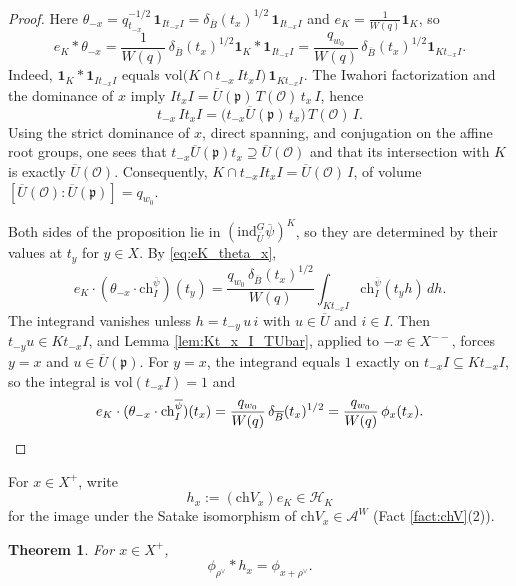 \documentclass[12pt]{article}
\numberwithin{equation}{section}
\newtheorem{theorem}{Theorem}[section]
\theoremstyle{definition}
\theoremstyle{remark}
\theoremstyle{plain}
\begin{document}
\begin{proof}
Here $\theta_{-x} = q_{t_{-x}}^{-1/2}\,\mathbf{1}_{It_{-x}I} = \delta_{\overline{B}}(t_{x})^{1/2}\,\mathbf{1}_{It_{-x}I}$ and $e_{K} = \frac{1}{W(q)}\mathbf{1}_{K}$, so
\begin{equation}\label{eq:eK_theta_x}
e_{K} * \theta_{-x} = \frac{1}{W(q)}\,\delta_{\overline{B}}(t_{x})^{1/2}\mathbf{1}_K * \mathbf{1}_{It_{-x}I} = \frac{q_{w_0}}{W(q)}\,\delta_{\overline{B}}(t_{x})^{1/2} \mathbf{1}_{Kt_{-x}I}.
\end{equation}
Indeed, $\mathbf{1}_K * \mathbf{1}_{It_{-x}I}$ equals $\mathrm{vol}\big(K \cap t_{-x}\, I t_{x} I\big)\,\mathbf{1}_{Kt_{-x}I}$. The Iwahori factorization and the dominance of $x$ imply $I t_x I = \overline{U}(\mathfrak{p})\, T(\mathcal{O})\, t_x\, I$, hence
$$t_{-x}\, I t_x I = \big(t_{-x}\overline{U}(\mathfrak{p})\, t_{x}\big)\, T(\mathcal{O})\, I.$$
Using the strict dominance of $x$, direct spanning, and conjugation on the affine root groups, one sees that $t_{-x}\overline U(\mathfrak p)t_x\supseteq\overline U(\mathcal O)$ and that its intersection with $K$ is exactly $\overline U(\mathcal O)$. Consequently, $K \cap t_{-x}It_xI = \overline{U}(\mathcal{O})\,I$, of volume $[\overline{U}(\mathcal{O}) : \overline{U}(\mathfrak{p})] = q_{w_0}$.

Both sides of the proposition lie in $(\mathrm{ind}_{\overline{U}}^{G}\overline{\psi})^{K}$, so they are determined by their values at $t_y$ for $y\in X$. By \eqref{eq:eK_theta_x},
$$e_{K}\cdot(\theta_{-x}\cdot \mathrm{ch}_{I}^{\overline{\psi}})(t_{y}) = \frac{q_{w_0}\,\delta_{\overline{B}}(t_{x})^{1/2}}{W(q)}\int_{Kt_{-x}I}\mathrm{ch}_{I}^{\overline{\psi}}(t_{y}h)\,dh.$$
The integrand vanishes unless $h = t_{-y}\,u\,i$ with $u \in \overline{U}$ and $i \in I$. Then $t_{-y}u \in Kt_{-x}I$, and Lemma \ref{lem:Kt_x_I_TUbar}, applied to $-x \in X^{--}$, forces $y = x$ and $u \in \overline{U}(\mathfrak p)$. For $y = x$, the integrand equals $1$ exactly on $t_{-x}I \subseteq Kt_{-x}I$, so the integral is $\mathrm{vol}(t_{-x}I) = 1$ and
\[e_{K}\cdot(\theta_{-x}\cdot \mathrm{ch}_{I}^{\overline{\psi}})(t_{x}) = \frac{q_{w_0}}{W(q)}\,\delta_{\overline{B}}(t_{x})^{1/2} = \frac{q_{w_0}}{W(q)}\,\phi_{x}(t_{x}). \qedhere\]
\end{proof}

For $x \in X^+$, write
\[ h_x := (\mathrm{ch}V_x)e_K \in \mathcal{H}_K \]
for the image under the Satake isomorphism of $\mathrm{ch}V_x \in \mathcal{A}^W$ (Fact \ref{fact:chV}(2)).

\begin{theorem}\label{thm:chVx_action_right}
For $x \in X^+$,
\[ \phi_{\rho^\vee} * h_x = \phi_{x + \rho^\vee}. \]
\end{theorem}
\end{document}
